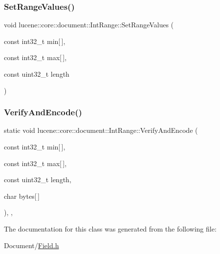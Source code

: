 \subsubsection{\texorpdfstring{Set\+Range\+Values()}{SetRangeValues()}}
{\footnotesize\ttfamily void lucene\+::core\+::document\+::\+Int\+Range\+::\+Set\+Range\+Values (\begin{DoxyParamCaption}\item[{const int32\+\_\+t}]{min\mbox{[}$\,$\mbox{]},  }\item[{const int32\+\_\+t}]{max\mbox{[}$\,$\mbox{]},  }\item[{const uint32\+\_\+t}]{length }\end{DoxyParamCaption})\hspace{0.3cm}{\ttfamily [inline]}}

\mbox{\label{classlucene_1_1core_1_1document_1_1IntRange_a536d7453de3ac80b6aeba4597e1b65c1}} 
\subsubsection{\texorpdfstring{Verify\+And\+Encode()}{VerifyAndEncode()}}
{\footnotesize\ttfamily static void lucene\+::core\+::document\+::\+Int\+Range\+::\+Verify\+And\+Encode (\begin{DoxyParamCaption}\item[{const int32\+\_\+t}]{min\mbox{[}$\,$\mbox{]},  }\item[{const int32\+\_\+t}]{max\mbox{[}$\,$\mbox{]},  }\item[{const uint32\+\_\+t}]{length,  }\item[{char}]{bytes\mbox{[}$\,$\mbox{]} }\end{DoxyParamCaption})\hspace{0.3cm}{\ttfamily [inline]}, {\ttfamily [static]}, {\ttfamily [private]}}



The documentation for this class was generated from the following file\+:\begin{DoxyCompactItemize}
\item 
Document/\mbox{\hyperlink{Document_2Field_8h}{Field.\+h}}\end{DoxyCompactItemize}
